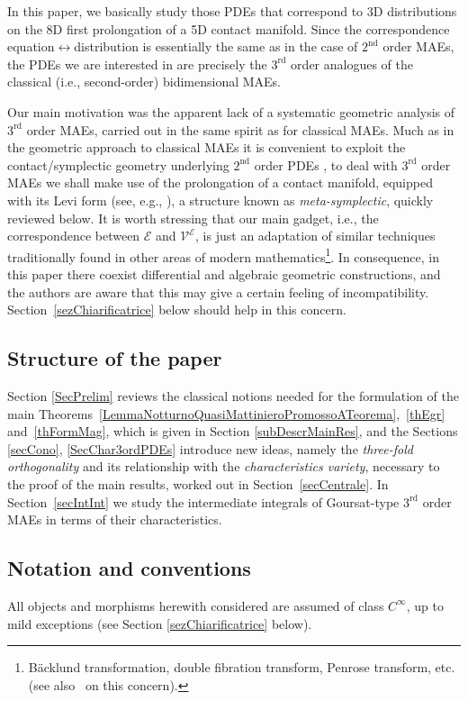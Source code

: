 \documentclass[pdftex]{sigma}
\newcommand{\M}{\mathcal{V}}
\newcommand{\E}{\mathcal{E}}
\newcommand{\Rd}{^\textrm{rd}}
\newcommand{\Nd}{^\textrm{nd}}
\numberwithin{equation}{section}
\begin{document}
In this paper, we basically
study those PDEs that correspond to 3D distributions on the 8D f\/irst prolongation of a 5D contact manifold.
Since the correspondence equation$\leftrightarrow$distribution is essentially the same as in the case of $2\Nd$ order MAEs, the PDEs we are interested in are precisely the $3\Rd$ order analogues
 of the classical (i.e., second-order) bidimensional MAEs.

Our main motivation was the apparent lack of a systematic geometric analysis of $3\Rd$ order MAEs,
carried out in the same spirit as for classical MAEs. Much as in the geometric approach to classical MAEs it is convenient to exploit the contact/symplectic geometry underlying $2\Nd$ order PDEs \cite{MR2383541, MR2503974,MR2805306,MR2352610,MR781584,MR1458653}, to deal with $3\Rd$ order MAEs we shall make use of the prolongation of a contact manifold, equipped with its Levi form (see, e.g., \cite[Section~2]{MR2279499}), a structure known as \emph{meta-symplectic}, quickly reviewed below. It is worth stressing that our main gadget, i.e., the correspondence between $\E$ and $\M^\E$, is just an adaptation of similar techniques traditionally found in other areas of modern mathematics\footnote{B\"acklund transformation, double f\/ibration transform, Penrose transform, etc. (see also~\cite{138544} on this concern).}.
In consequence, in this paper there coexist dif\/ferential and algebraic geometric constructions, and the authors are aware that this may give a certain feeling of incompatibility. Section~\ref{sezChiarificatrice} below should help in this concern.

\subsection*{Structure of the paper}
Section \ref{SecPrelim} reviews the classical notions needed for the formulation of the main Theo\-rems~\ref{LemmaNotturnoQuasiMattinieroPromossoATeorema},~\ref{thEgr} and~\ref{thFormMag}, which is given in Section \ref{subDescrMainRes}, and the Sections \ref{secCono}, \ref{SecChar3ordPDEs} introduce new ideas, namely the \emph{three-fold orthogonality} and its relationship with the \emph{characteristics variety}, necessary to the proof of the main results, worked out in Section~\ref{secCentrale}.
In Section~\ref{secIntInt} we study the intermediate integrals of Goursat-type $3\Rd$ order MAEs in terms of their characteristics.

\subsection*{Notation and conventions}
All objects and morphisms herewith considered are assumed of class $C^\infty$, up to mild exceptions (see Section \ref{sezChiarificatrice} below).
\end{document}

